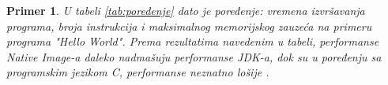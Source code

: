 \documentclass[a4paper]{article}
\newtheorem{primer}{Primer}[section]
\begin{document}
\begin{primer}
U tabeli \ref{tab:poređenje} dato je poređenje: vremena izvršavanja programa, broja instrukcija i maksimalnog memorijskog zauzeća na primeru programa "Hello World". Prema rezultatima navedenim u tabeli, performanse Native Image-a daleko nadmašuju performanse JDK-a, dok su u poređenju sa programskim jezikom C, performanse neznatno lošije \cite{PregledSistema}.
\end{primer}


\begin{table}[h!]
\begin{center}
\end{center}
\end{table}
\end{document}
